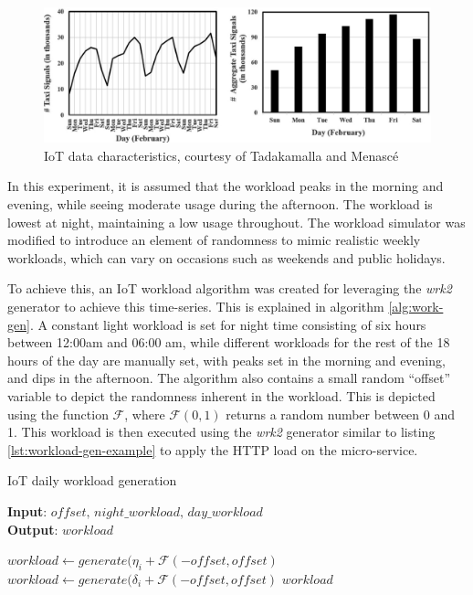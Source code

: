 \begin{figure}[htb]
    \centering
    \caption{IoT data characteristics, courtesy of Tadakamalla and Menasc{\'e} \cite{tadakamalla2019characterization}}
    \label{fig:iot-workload-characteristics}
    \includegraphics[width=1.0\linewidth]{Figures/IoT-Workload-Characteristics.pdf}
\end{figure}

In this experiment, it is assumed that the workload peaks in the morning and evening, while seeing moderate usage during the afternoon. The workload is lowest at night, maintaining a low usage throughout. The workload simulator was modified to introduce an element of randomness to mimic realistic weekly workloads, which can vary on occasions such as weekends and public holidays.\par

To achieve this, an IoT workload algorithm was created for leveraging the \textit{wrk2} generator to achieve this time-series. This is explained in algorithm \ref{alg:work-gen}. A constant light workload is set for night time consisting of six hours between 12:00am and 06:00 am, while different workloads for the rest of the 18 hours of the day are manually set, with peaks set in the morning and evening, and dips in the afternoon. The algorithm also contains a small random ``offset'' variable to depict the randomness inherent in the workload. This is depicted using the function $\mathcal{F}$, where $\mathcal{F}(0,1)$ returns a random number between 0 and 1. This workload is then executed using the \textit{wrk2} generator similar to listing \ref{lst:workload-gen-example} to apply the HTTP load on the micro-service.

\begin{algorithm}
    \caption{IoT daily workload generation}
    \label{alg:work-gen}
    \textbf{Input}: $offset,\,night\_workload,\,day\_workload$\\
    \textbf{Output}: $workload$
    \begin{algorithmic}
            \State $workload \gets generate(\eta_{i} + \mathcal{F}(-offset,offset)$
        \EndFor
            \State $workload \gets generate(\delta_{i} + \mathcal{F}(-offset,offset)$
        \EndFor
        \State \Return $workload$
    \end{algorithmic}
\end{algorithm}

